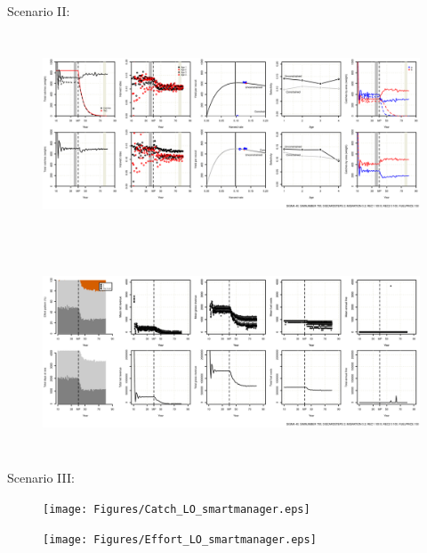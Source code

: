 \documentclass[12pt,oneline,a4paper,numbib]{ouparticle}
\begin{document}
\newpage
\begin{landscape}
Scenario II:
\begin{figure}[!h]
\centering
\includegraphics[width=\textheight,height=6cm]{Figures/Catch_LO_disc_YieldLand.eps} 
\caption{}
\label{fig:catch_lo}
\end{figure}

\begin{figure}[!h]
\centering
\includegraphics[width=\textheight,height=6cm]{Figures/Effort_LO_disc_YieldLand.eps} 
\caption{}
\label{fig:effort_lo}
\end{figure}
\end{landscape}

\newpage
\begin{landscape}
Scenario III:

\begin{figure}[!h]
\centering
\texttt{[image: Figures/Catch\_LO\_smartmanager.eps]} 
\caption{}
\label{fig:catch_lo}
\end{figure}

\begin{figure}[!h]
\centering
\texttt{[image: Figures/Effort\_LO\_smartmanager.eps]} 
\caption{}
\label{fig:effort_lo}
\end{figure}
\end{landscape}
\end{document}
